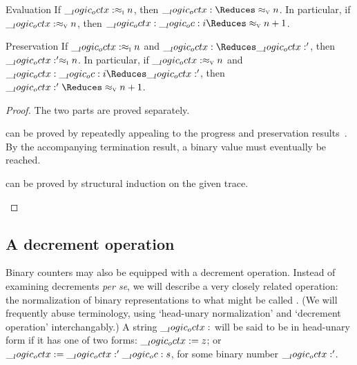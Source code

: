 \begin{corollary}
  \leavevmode
  \begin{thmdescription}
  \item[Evaluation]
    If $\__logic_octx: \approx\sb{\text{\normalfont\scshape i}} n$, then $\octx \Reduces\aval{}{n}$.
    In particular, if $\__logic_octx: \approx\sb{\text{\normalfont\scshape v}} n$, then $\octx \oc i \Reduces\aval{}{n+1}$.
  \item[Preservation]
    If $\__logic_octx: \approx\sb{\text{\normalfont\scshape i}} n$ and $\octx \Reduces \octx'$, then $\__logic_octx:' \approx\sb{\text{\normalfont\scshape i}} n$.
    In particular, if $\__logic_octx: \approx\sb{\text{\normalfont\scshape v}} n$ and $\octx \oc i \Reduces \octx'$, then $\octx' \Reduces\aval{}{n+1}$.
  \end{thmdescription}
\end{corollary}
\begin{proof}
  The two parts are proved separately.
  \begin{description}[labelsep=0.35em]
  \item[Evaluation] can be proved by repeatedly appealing to the progress and preservation results~.
    By the accompanying termination result, a binary value must eventually be reached.
  \item[Preservation] can be proved by structural induction on the given trace.
  \qedhere
  \end{description}
\end{proof}



\subsection{A decrement operation}

Binary counters may also be equipped with a decrement operation.
Instead of examining decrements \emph{per se}, we will describe a very closely related operation: the normalization of binary representations to what might be called .
(We will frequently abuse terminology, using \enquote*{head-unary normalization} and \enquote*{decrement operation} interchangably.)
A string $\__logic_octx:$ will be said to be in head-unary form if it has one of two forms: $\__logic_octx: = z$; or $\__logic_octx: = \__logic_octx:' \__logic_oc: s$, for some binary number $\__logic_octx:'$.

